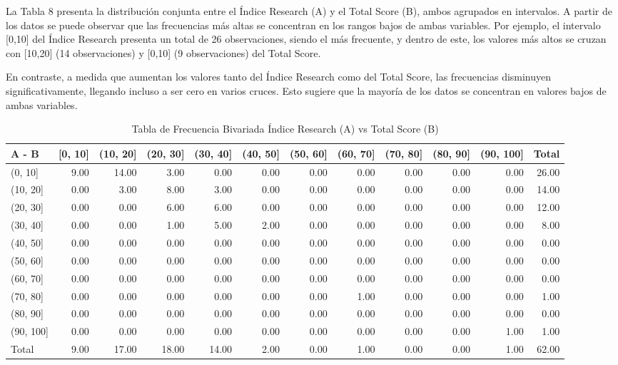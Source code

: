 \documentclass[
]{article}
\begin{document}
\begin{multicols}{2}

La Tabla 8 presenta la distribución conjunta entre el Índice Research (A) y el Total Score (B), ambos agrupados en intervalos. A partir de los datos se puede observar que las frecuencias más altas se concentran en los rangos bajos de ambas variables. Por ejemplo, el intervalo [0,10] del Índice Research presenta un total de 26 observaciones, siendo el más frecuente, y dentro de este, los valores más altos se cruzan con [10,20] (14 observaciones) y [0,10] (9 observaciones) del Total Score.

En contraste, a medida que aumentan los valores tanto del Índice Research como del Total Score, las frecuencias disminuyen significativamente, llegando incluso a ser cero en varios cruces. Esto sugiere que la mayoría de los datos se concentran en valores bajos de ambas variables.

\end{multicols}

\renewcommand{\arraystretch}{1.3}
\begin{scriptsize}%
\begin{longtable}{lrrrrrrrrrrr}
\caption{Tabla de Frecuencia Bivariada Índice Research (A) vs Total Score (B)} \\ 
  \hline
A   -   B & [0, 10] & (10, 20] & (20, 30] & (30, 40] & (40, 50] & (50, 60] & (60, 70] & (70, 80] & (80, 90] & (90, 100] & Total \\ 
  \hline
(0, 10] & 9.00 & 14.00 & 3.00 & 0.00 & 0.00 & 0.00 & 0.00 & 0.00 & 0.00 & 0.00 & 26.00 \\ 
  (10, 20] & 0.00 & 3.00 & 8.00 & 3.00 & 0.00 & 0.00 & 0.00 & 0.00 & 0.00 & 0.00 & 14.00 \\ 
  (20, 30] & 0.00 & 0.00 & 6.00 & 6.00 & 0.00 & 0.00 & 0.00 & 0.00 & 0.00 & 0.00 & 12.00 \\ 
  (30, 40] & 0.00 & 0.00 & 1.00 & 5.00 & 2.00 & 0.00 & 0.00 & 0.00 & 0.00 & 0.00 & 8.00 \\ 
  (40, 50] & 0.00 & 0.00 & 0.00 & 0.00 & 0.00 & 0.00 & 0.00 & 0.00 & 0.00 & 0.00 & 0.00 \\ 
  (50, 60] & 0.00 & 0.00 & 0.00 & 0.00 & 0.00 & 0.00 & 0.00 & 0.00 & 0.00 & 0.00 & 0.00 \\ 
  (60, 70] & 0.00 & 0.00 & 0.00 & 0.00 & 0.00 & 0.00 & 0.00 & 0.00 & 0.00 & 0.00 & 0.00 \\ 
  (70, 80] & 0.00 & 0.00 & 0.00 & 0.00 & 0.00 & 0.00 & 1.00 & 0.00 & 0.00 & 0.00 & 1.00 \\ 
  (80, 90] & 0.00 & 0.00 & 0.00 & 0.00 & 0.00 & 0.00 & 0.00 & 0.00 & 0.00 & 0.00 & 0.00 \\ 
  (90, 100] & 0.00 & 0.00 & 0.00 & 0.00 & 0.00 & 0.00 & 0.00 & 0.00 & 0.00 & 1.00 & 1.00 \\ 
  Total & 9.00 & 17.00 & 18.00 & 14.00 & 2.00 & 0.00 & 1.00 & 0.00 & 0.00 & 1.00 & 62.00 \\ 
   \hline
\hline
\end{longtable}
\end{scriptsize}\renewcommand{\arraystretch}{1}
\end{document}
